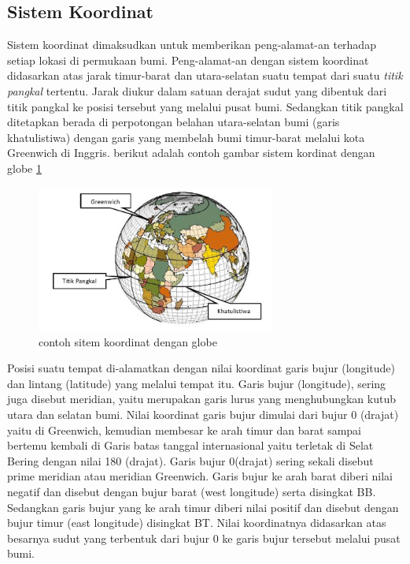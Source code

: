 \subsection{Sistem Koordinat}
Sistem koordinat dimaksudkan untuk memberikan peng-alamat-an terhadap setiap lokasi di permukaan bumi. Peng-alamat-an dengan sistem koordinat didasarkan atas jarak timur-barat dan utara-selatan suatu tempat dari suatu \textit{titik pangkal} tertentu. Jarak diukur dalam satuan derajat sudut yang dibentuk dari titik pangkal ke posisi tersebut yang melalui pusat bumi. Sedangkan titik pangkal ditetapkan berada di perpotongan belahan utara-selatan bumi (garis khatulistiwa) dengan garis yang membelah bumi timur-barat melalui kota Greenwich di Inggris. berikut adalah contoh gambar sistem kordinat dengan globe \ref{kordinat}
\begin{figure}[ht]
	\centerline{\includegraphics[width=0.70\textwidth]{pictures/kordinat.jpg}}
	\caption{contoh sitem koordinat dengan globe}
	\label{kordinat}
	\end{figure}

Posisi suatu tempat di-alamatkan dengan nilai koordinat garis bujur (longitude) dan lintang (latitude) yang melalui tempat itu. Garis bujur (longitude), sering juga disebut meridian, yaitu merupakan garis lurus yang menghubungkan kutub utara dan selatan bumi. Nilai koordinat garis bujur dimulai dari bujur 0 (drajat) yaitu di Greenwich, kemudian membesar ke arah timur dan barat sampai bertemu kembali di Garis batas tanggal internasional yaitu terletak di Selat Bering dengan nilai 180 (drajat). Garis bujur 0(drajat) sering sekali disebut prime meridian atau meridian Greenwich. Garis bujur ke arah barat diberi nilai negatif dan disebut dengan bujur barat (west longitude) serta disingkat BB. Sedangkan garis bujur yang ke arah timur diberi nilai positif dan disebut dengan bujur timur (east longitude) disingkat BT. Nilai koordinatnya didasarkan atas besarnya sudut yang terbentuk dari bujur 0 ke garis bujur tersebut melalui pusat bumi.

